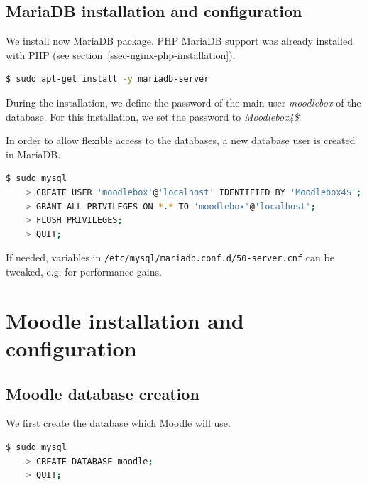 \documentclass[12pt]{article}
\begin{document}
\subsection{MariaDB installation and configuration}

We install now MariaDB package.
PHP MariaDB support was already installed with PHP (see section~\ref{ssec-nginx-php-installation}).
\begin{lstlisting}[language=bash]
$ sudo apt-get install -y mariadb-server
\end{lstlisting}

During the installation, we define the password of the main user \emph{moodlebox} of the database.
For this installation, we set the password to \emph{Moodlebox4\$}.

In order to allow flexible access to the databases, a new database user is created in MariaDB.

\begin{lstlisting}[language=bash]
$ sudo mysql
    > CREATE USER 'moodlebox'@'localhost' IDENTIFIED BY 'Moodlebox4$';
    > GRANT ALL PRIVILEGES ON *.* TO 'moodlebox'@'localhost';
    > FLUSH PRIVILEGES;
    > QUIT;
\end{lstlisting}

If needed, variables in \lstinline{/etc/mysql/mariadb.conf.d/50-server.cnf} can be tweaked, e.g. for performance gains.

\section{Moodle installation and configuration}

\subsection{Moodle database creation}

We first create the database which Moodle will use.
\begin{lstlisting}[language=bash]
$ sudo mysql
    > CREATE DATABASE moodle;
    > QUIT;
\end{lstlisting}
\end{document}
